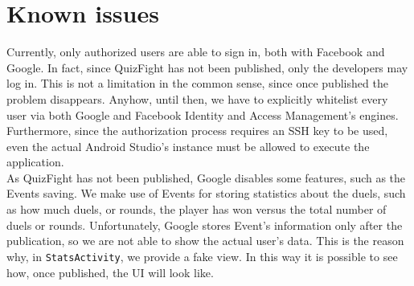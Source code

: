\section{Known issues}\label{sec:issues}
Currently, only authorized users are able to sign in, both with Facebook and
Google. In fact, since QuizFight has not been published, only the developers
may log in. This is not a limitation in the common sense, since once published
the problem disappears. Anyhow, until then, we have to explicitly whitelist
every user via both Google and Facebook Identity and Access Management's engines.
Furthermore, since the authorization process requires an SSH key to be used, 
even the actual Android Studio's instance must be allowed to execute
the application. \\

As QuizFight has not been published, Google disables some features, such as the
Events saving. We make use of Events for storing statistics about the duels, 
such as how much duels, or rounds, the player has won versus the total number
of duels or rounds. Unfortunately, Google stores Event's information only after
the publication, so we are not able to show the actual user's data. This is the 
reason why, in \texttt{StatsActivity}, we provide a fake view. In this way it
is possible to see how, once published, the UI will look like. 
